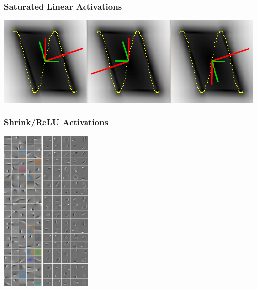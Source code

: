 \documentclass{beamer}
\begin{document}
\begin{frame}
\frametitle{Saturated Linear Activations} 
\centerline{\includegraphics[scale=0.3]{./images/SATAE/toy_sat_linear_reg.png}}
\end{frame} 

\begin{frame} 
\frametitle{Shrink/ReLU Activations} 
\begin{center} 
\includegraphics[width=0.15\textwidth]{./images/SATAE/CIFAR_shrink01.png} \hspace{1cm} 
\includegraphics[width=0.18\textwidth]{./images/SATAE/strokes_full.png}
\end{center} 
\end{frame} 
\end{document}
